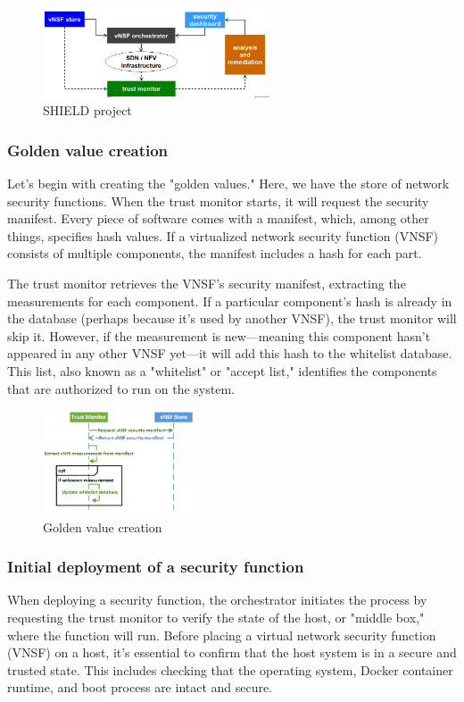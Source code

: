 \begin{figure}[H]
  \centering
  \includegraphics[width=0.6\textwidth]{img/SHIELD project.png}
  \caption{SHIELD project}
\end{figure}

\subsubsection{Golden value creation}
Let's begin with creating the "golden values." Here, we have the store
of network security functions. When the trust monitor starts, it will
request the security manifest. Every piece of software comes with a
manifest, which, among other things, specifies hash values. If a
virtualized network security function (VNSF) consists of multiple
components, the manifest includes a hash for each part.

The trust monitor retrieves the VNSF's security manifest, extracting
the measurements for each component. If a particular component's hash
is already in the database (perhaps because it's used by another
VNSF), the trust monitor will skip it. However, if the measurement is
new—meaning this component hasn't appeared in any other VNSF yet—it
will add this hash to the whitelist database. This list, also known as
a "whitelist" or "accept list," identifies the components that are
authorized to run on the system.

\begin{figure}[H]
  \centering
  \includegraphics[width=0.4\textwidth]{img/shield golden value.png}
  \caption{Golden value creation}
\end{figure}

\subsubsection{Initial deployment of a security function}
When deploying a security function, the orchestrator initiates the
process by requesting the trust monitor to verify the state of the
host, or "middle box," where the function will run. Before placing a
virtual network security function (VNSF) on a host, it’s essential to
confirm that the host system is in a secure and trusted state. This
includes checking that the operating system, Docker container runtime,
and boot process are intact and secure.

